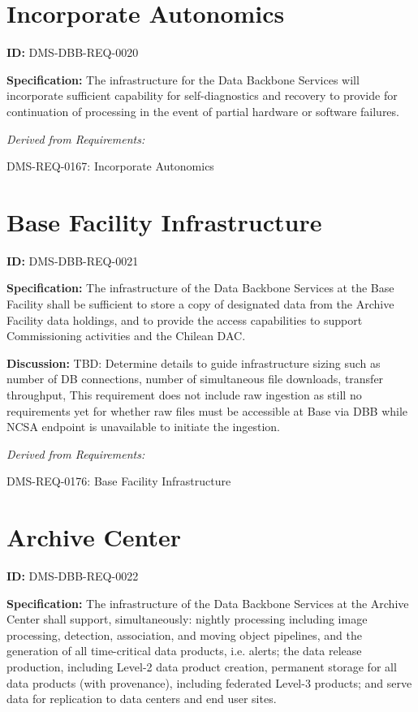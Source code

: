 \documentclass[SE,toc,lsstdraft]{lsstdoc}
\begin{document}
\section{Incorporate Autonomics}

\label{DMS-DBB-REQ-0020}
\textbf{ID:} DMS-DBB-REQ-0020

\textbf{Specification:}
The infrastructure for the Data Backbone Services will incorporate sufficient capability for self-diagnostics and recovery to provide for continuation of processing in the event of partial hardware or software failures.

\emph{Derived from Requirements:}

DMS-REQ-0167:
Incorporate Autonomics \newline

\section{Base Facility Infrastructure}

\label{DMS-DBB-REQ-0021}
\textbf{ID:} DMS-DBB-REQ-0021

\textbf{Specification:}
The infrastructure of the Data Backbone Services at the Base Facility shall be sufficient to store a copy of designated data from the Archive Facility data holdings, and to provide the access capabilities to support Commissioning activities and the Chilean DAC.

\textbf{Discussion:}
TBD:  Determine details to guide infrastructure sizing such as number of DB connections, number of simultaneous file downloads, transfer throughput,    This requirement does not include raw ingestion as still no requirements yet for whether raw files must be accessible at Base via DBB while NCSA endpoint is unavailable to initiate the ingestion.

\emph{Derived from Requirements:}

DMS-REQ-0176:
Base Facility Infrastructure \newline

\section{Archive Center}

\label{DMS-DBB-REQ-0022}
\textbf{ID:} DMS-DBB-REQ-0022

\textbf{Specification:}
The infrastructure of the Data Backbone Services at the Archive Center shall support, simultaneously: nightly processing including image processing, detection, association, and moving object pipelines, and the generation of all time-critical data products, i.e. alerts; the data release production, including Level-2 data product creation, permanent storage for all data products (with provenance), including federated Level-3 products; and serve data for replication to data centers and end user sites.
\end{document}
